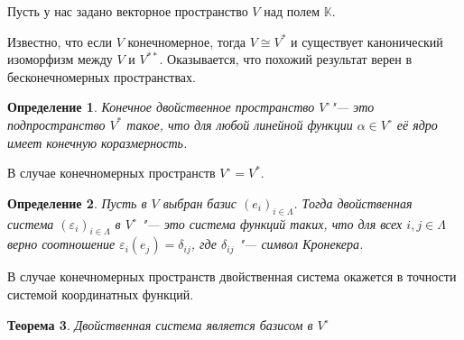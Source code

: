 \documentclass[12pt, reqno, a4paper, oneside, notitlepage]{amsart}
\theoremstyle{mytheoremstyle}
\newtheorem{theorem}{Теорема}[section]
\theoremstyle{myremarkstyle}
\newtheorem{definition}[theorem]{Определение}
\numberwithin{equation}{section}
\begin{document}
Пусть у нас задано векторное пространство $V$ над полем $\mathbb{K}$. 

Известно, что если $V$ конечномерное, тогда $V \cong V^*$ и существует канонический изоморфизм между $V$ и $V^{**}$. Оказывается, что похожий результат верен в бесконечномерных пространствах. 

\begin{definition} 
Конечное двойственное пространство $V^\circ$"--- это подпространство $V^*$ такое, что для любой линейной функции $\alpha \in V^\circ$ её ядро имеет конечную коразмерность.
\end{definition}

В случае конечномерных пространств $V^\circ = V^*$.

\begin{definition}
    Пусть в $V$ выбран базис $(e_i)_{i \in \Lambda}$. Тогда 
    двойственная система $(\varepsilon_i)_{i \in \Lambda}$ в $V^\circ$ "--- это система функций  таких, что для всех $i, j \in \Lambda$ верно соотношение $\varepsilon_i(e_j) = \delta_{ij}$, где $\delta_{ij}$ "--- символ Кронекера.
\end{definition}

В случае конечномерных пространств двойственная система окажется в точности системой координатных функций. 

\begin{theorem}
    Двойственная система является базисом в $V^\circ$
\end{theorem}
\end{document}
